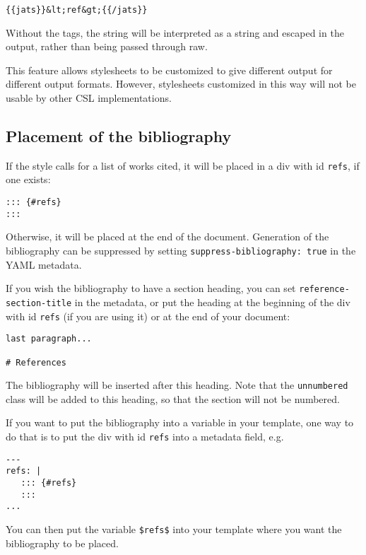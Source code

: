 \documentclass[
]{article}
\begin{document}
\begin{verbatim}
{{jats}}&lt;ref&gt;{{/jats}}
\end{verbatim}

Without the tags, the string will be interpreted as a string and escaped
in the output, rather than being passed through raw.

This feature allows stylesheets to be customized to give different
output for different output formats. However, stylesheets customized in
this way will not be usable by other CSL implementations.

\hypertarget{placement-of-the-bibliography}{%
\subsection{Placement of the
bibliography}\label{placement-of-the-bibliography}}

If the style calls for a list of works cited, it will be placed in a div
with id \texttt{refs}, if one exists:

\begin{verbatim}
::: {#refs}
:::
\end{verbatim}

Otherwise, it will be placed at the end of the document. Generation of
the bibliography can be suppressed by setting
\texttt{suppress-bibliography:\ true} in the YAML metadata.

If you wish the bibliography to have a section heading, you can set
\texttt{reference-section-title} in the metadata, or put the heading at
the beginning of the div with id \texttt{refs} (if you are using it) or
at the end of your document:

\begin{verbatim}
last paragraph...

# References
\end{verbatim}

The bibliography will be inserted after this heading. Note that the
\texttt{unnumbered} class will be added to this heading, so that the
section will not be numbered.

If you want to put the bibliography into a variable in your template,
one way to do that is to put the div with id \texttt{refs} into a
metadata field, e.g.

\begin{verbatim}
---
refs: |
   ::: {#refs}
   :::
...
\end{verbatim}

You can then put the variable \texttt{\$refs\$} into your template where
you want the bibliography to be placed.
\end{document}
